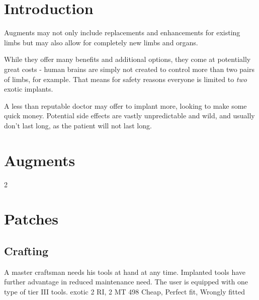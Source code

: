 \documentclass[12pt,a4paper,openany,usenames,dvipsnames]{book}
\begin{document}
	

    \chapter{Introduction}
    Augments may not only include replacements and enhancements for existing limbs but may also allow for completely new limbs and organs.
    \par
    While they offer many benefits and additional options, they come at potentially great costs
    	- human brains are simply not created to control more than two pairs of limbs, for example.
   	That means for safety reasons everyone is limited to \emph{two} exotic implants.
    \par
    A less than reputable doctor may offer to implant more, looking to make some quick money. Potential side effects are vastly unpredictable and wild, and usually don't last long, as the patient will not last long.

    \chapter{Augments}
    \newcommand{\lastcategory}{-}
	\begin{multicols}{2}
	\end{multicols}

	\chapter{Patches}
	\section{Crafting}
		{A master craftsman needs his tools at hand at any time. Implanted tools have further advantage in reduced maintenance need.}
		{The user is equipped with one type of tier III tools.}
		{exotic}
		{2 RI, 2 MT}
		{498}
		{Cheap, Perfect fit, Wrongly fitted}
	
\end{document}
